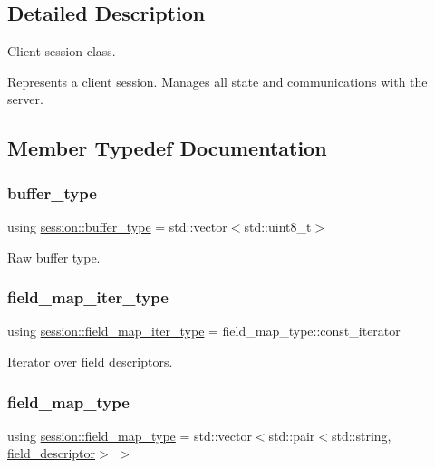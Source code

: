 \subsection{Detailed Description}
Client session class. 

Represents a client session. Manages all state and communications with the server. 

\subsection{Member Typedef Documentation}
\mbox{\label{classsession_a6d23252848c7fc9419e4bf318d57b43d}} 
\subsubsection{\texorpdfstring{buffer\+\_\+type}{buffer\_type}}
{\footnotesize\ttfamily using \hyperlink{classsession_a6d23252848c7fc9419e4bf318d57b43d}{session\+::buffer\+\_\+type} =  std\+::vector$<$std\+::uint8\+\_\+t$>$}



Raw buffer type. 

\mbox{\label{classsession_a1124fe81d0a0c740c46f101818980aff}} 
\subsubsection{\texorpdfstring{field\+\_\+map\+\_\+iter\+\_\+type}{field\_map\_iter\_type}}
{\footnotesize\ttfamily using \hyperlink{classsession_a1124fe81d0a0c740c46f101818980aff}{session\+::field\+\_\+map\+\_\+iter\+\_\+type} =  field\+\_\+map\+\_\+type\+::const\+\_\+iterator}



Iterator over field descriptors. 

\mbox{\label{classsession_a89f9e4e228170509957350abccad4ff0}} 
\subsubsection{\texorpdfstring{field\+\_\+map\+\_\+type}{field\_map\_type}}
{\footnotesize\ttfamily using \hyperlink{classsession_a89f9e4e228170509957350abccad4ff0}{session\+::field\+\_\+map\+\_\+type} =  std\+::vector$<$std\+::pair$<$std\+::string, \hyperlink{structsession_1_1field__descriptor}{field\+\_\+descriptor}$>$ $>$}



